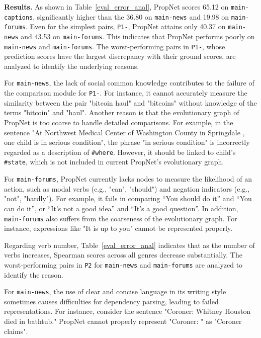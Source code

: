 \textbf{Results.} As shown in Table~\ref{eval_error_anal}, PropNet scores 65.12 on \texttt{main-captions}, significantly higher than the 36.80 on \texttt{main-news} and 19.98 on \texttt{main-forums}. Even for the simplest pairs, \texttt{P1-}, PropNet attains only 40.37 on \texttt{main-news} and 43.53 on \texttt{main-forums}. This indicates that PropNet performs poorly on \texttt{main-news} and \texttt{main-forums}. The worst-performing pairs in \texttt{P1-}, whose prediction scores have the largest discrepancy with their ground scores, are analyzed to identify the underlying reasons. 


For \texttt{main-news}, the lack of social common knowledge contributes to the failure of the comparison module for \texttt{P1-}. For instance, it cannot accurately measure the similarity between the pair "bitcoin haul" and "bitcoins" without knowledge of the terms "bitcoin" and "haul". Another reason is that the evolutionary graph of PropNet is too coarse to handle detailed comparisons. For example, in the sentence "At Northwest Medical Center of Washington County in Springdale , one child is in serious condition", the phrase "in serious condition" is incorrectly regarded as a description of \texttt{\#where}. However, it should be linked to child's \texttt{\#state}, which is not included in current PropNet's evolutionary graph. 

For \texttt{main-forums}, PropNet currently lacks nodes to measure the likelihood of an action, such as modal verbs (e.g., "can", "should") and negation indicators (e.g., "not", "hardly"). For example, it fails in comparing ``You should do it'' and ``You can do it'', or ``It's not a good idea'' and ``It's a good question''. In addition, \texttt{main-forums} also suffers from the coarseness of the evolutionary graph. For instance, expressions like "It is up to you" cannot be represented properly. 

Regarding verb number, Table~\ref{eval_error_anal} indicates that as the number of verbs increases, Spearman scores across all genres decrease substantially. The worst-performing pairs in \texttt{P2} for \texttt{main-news} and \texttt{main-forums} are analyzed to identify the reason. 

For \texttt{main-news}, the use of clear and concise language in its writing style sometimes causes difficulties for dependency parsing, leading to failed representations. For instance, consider the sentence "Coroner: Whitney Houston died in bathtub." PropNet cannot properly represent "Coroner: " as "Coroner claims". 

